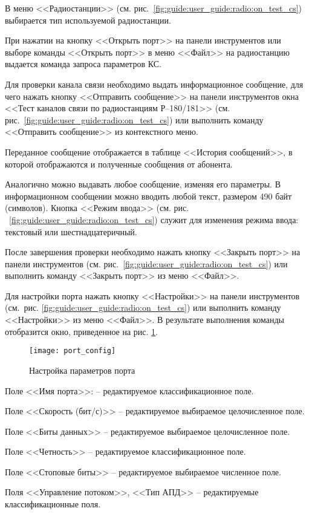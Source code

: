 В меню <<Радиостанции>> (см. рис.~\ref{fig:guide:user_guide:radio:on_test_cs}) выбирается тип используемой радиостанции.

При нажатии на кнопку <<Открыть порт>> на панели инструментов или выборе команды <<Открыть порт>> в меню <<Файл>> на радиостанцию выдается команда запроса параметров КС.

Для проверки канала связи необходимо выдать информационное сообщение, для чего нажать кнопку <<Отправить сообщение>> на
панели инструментов окна <<Тест каналов связи по радиостанциям Р–180/181>> (см.
рис.~\ref{fig:guide:user_guide:radio:on_test_cs}) или выполнить команду <<Отправить сообщение>> из контекстного меню.

Переданное сообщение отображается в таблице <<История сообщений>>, в которой отображаются и полученные сообщения от абонента.

Аналогично можно выдавать любое сообщение, изменяя его параметры. В информационном сообщении можно вводить любой текст,
размером 490 байт (символов). Кнопка <<Режим ввода>> (см. рис. ~\ref{fig:guide:user_guide:radio:on_test_cs}) служит для изменения режима ввода: текстовый или шестнадцатеричный.

После завершения проверки необходимо нажать кнопку <<Закрыть порт>> на панели инструментов (см.
рис.~\ref{fig:guide:user_guide:radio:on_test_cs}) или выполнить команду <<Закрыть порт>> из меню <<Файл>>.

Для настройки порта нажать кнопку <<Настройки>> на панели инструментов (см. рис. \ref{fig:guide:user_guide:radio:on_test_cs}) или выполнить команду
<<Настройки>> из меню <<Файл>>.
В результате выполнения команды отобразится окно, приведенное на рис. \ref{fig:guide:user_guide:radio:port_config}.
\begin{figure}[htb]
	\centering
	\texttt{[image: port\_config]}
	\caption{Настройка параметров порта}
	\label{fig:guide:user_guide:radio:port_config}
\end{figure}
Поле <<Имя порта>>: -- редактируемое классификационное поле.

Поле <<Скорость (бит/с)>> -- редактируемое выбираемое целочисленное поле.

Поле <<Биты данных>> -- редактируемое выбираемое целочисленное поле.

Поле <<Четность>> -- редактируемое классификационное поле.

Поле <<Стоповые биты>> -- редактируемое выбираемое численное поле.

Поля <<Управление потоком>>, <<Тип АПД>> -- редактируемые классификационные поля.

